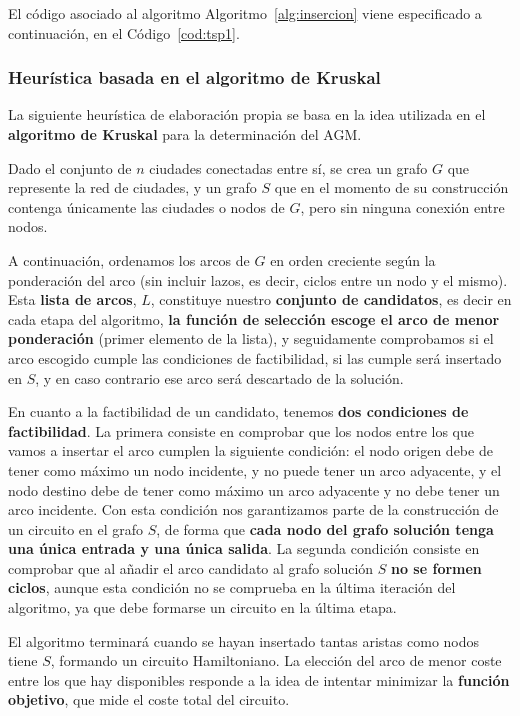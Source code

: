El código asociado al algoritmo Algoritmo~\ref{alg:insercion} viene especificado
a continuación, en el Código~\ref{cod:tsp1}. 



\subsubsection{Heurística basada en el algoritmo de Kruskal} 

La siguiente heurística de elaboración propia se basa en la idea utilizada en el \textbf{algoritmo de Kruskal} para la determinación del AGM. 

Dado el conjunto de $n$ ciudades conectadas entre sí, se crea un grafo $G$ que represente la red de ciudades, y un grafo $S$ que en el momento de su construcción contenga únicamente las ciudades o nodos de $G$, pero sin ninguna conexión entre nodos.

A continuación, ordenamos los arcos de $G$ en orden creciente según la ponderación del arco (sin incluir lazos, es decir, ciclos entre un nodo y el mismo). Esta \textbf{lista de arcos}, $L$, constituye nuestro \textbf{conjunto de candidatos}, es decir en cada etapa del algoritmo, \textbf{la función de selección escoge el arco de menor ponderación} (primer elemento de la lista), y seguidamente comprobamos si el arco escogido cumple las condiciones de factibilidad, si las cumple será insertado en $S$, y en caso contrario ese arco será descartado de la solución. 

En cuanto a la factibilidad de un candidato, tenemos \textbf{dos condiciones de factibilidad}. La primera consiste en comprobar que los nodos entre los que vamos a insertar el arco cumplen la siguiente condición: el nodo origen debe de tener como máximo un nodo incidente, y no puede tener un arco adyacente, y el nodo destino debe de tener como máximo un arco adyacente y no debe tener un arco incidente. Con esta condición nos garantizamos parte de la construcción de un circuito en el grafo $S$, de forma que \textbf{cada nodo del grafo solución tenga una única entrada y una única salida}. La segunda condición consiste en comprobar que al añadir el arco candidato al grafo solución $S$ \textbf{no se formen ciclos}, aunque esta condición no se comprueba en la última iteración del algoritmo, ya que debe formarse un circuito en la última etapa.

El algoritmo terminará cuando se hayan insertado tantas aristas como nodos tiene $S$, formando un circuito Hamiltoniano. La elección del arco de menor coste entre los que hay disponibles responde a la idea de intentar minimizar la \textbf{función objetivo}, que mide el coste total del circuito.

